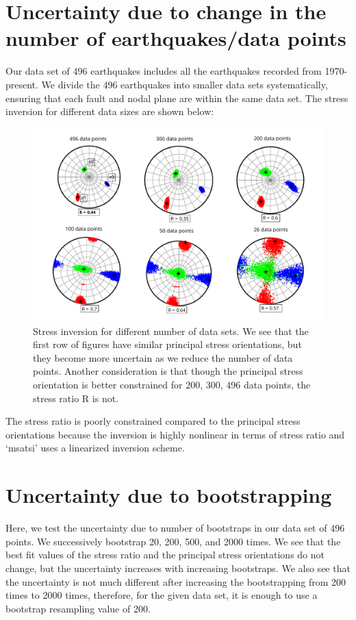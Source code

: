 \documentclass[11pt]{article}
\begin{document}
\section*{Uncertainty due to change in the number of earthquakes/data points}
Our data set of 496 earthquakes includes all the earthquakes recorded from 1970-present. We divide the 496 earthquakes into smaller data sets systematically, ensuring that each fault and nodal plane are within the same data set. The stress inversion for different data sizes are shown below: 

\begin{figure}[!htb]
    \centering
    \includegraphics[scale=0.7]{data_uncert.pdf}
    \caption{Stress inversion for different number of data sets. We see that the first row of figures have similar principal stress orientations, but they become more uncertain as we reduce the number of data points. Another consideration is that though the principal stress orientation is better constrained for 200, 300, 496 data points, the stress ratio R is not.}
\end{figure}

The stress ratio is poorly constrained compared to the principal stress orientations because the inversion is highly nonlinear in terms of stress ratio and `msatsi' uses a linearized inversion scheme.

\section*{Uncertainty due to bootstrapping}
Here, we test the uncertainty due to number of bootstraps in our data set of 496 points. We successively  bootstrap 20, 200, 500, and 2000 times. We see that the best fit values of the stress ratio and the principal stress orientations do not change, but the uncertainty increases with increasing bootstraps. We also see that the uncertainty is not much different after increasing the bootstrapping from 200 times to 2000 times, therefore, for the given data set, it is enough to use a bootstrap resampling value of 200.
\end{document}
